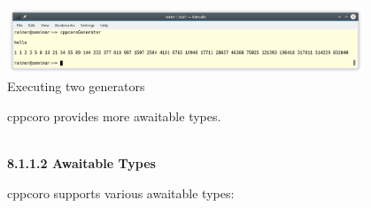 \begin{center}
\includegraphics[width=0.8\textwidth]{content/5/chapter8/images/2.png}\\
Executing two generators
\end{center}

cppcoro provides more awaitable types.

\hspace*{\fill} \\ %
\noindent
\textbf{8.1.1.2\hspace{0.2cm} Awaitable Types}

cppcoro supports various awaitable types:






































